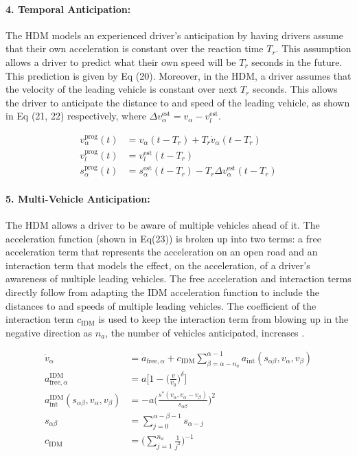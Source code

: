 \documentclass[12pt]{article}
\begin{document}
\paragraph{4. Temporal Anticipation:}
The HDM models an experienced driver's anticipation by having drivers assume that their own acceleration is constant over the reaction time $T_r$.  This assumption allows a driver to predict what their own speed will be $T_r$ seconds in the future.  This prediction is given by Eq (20).  Moreover, in the HDM, a driver assumes that the velocity of the leading vehicle is constant over next $T_r$ seconds.  This allows the driver to anticipate the distance to and speed of the leading vehicle, as shown in Eq (21, 22) respectively, where $\Delta v_\alpha^\text{est}=v_\alpha-v_l^\text{est}$.
\begin{mymathbox}[ams gather, title=Temporal Anticipation Equations,colframe=blue!30!black]
  \begin{align}
  v_\alpha^{\text{prog}}(t)&=v_\alpha(t-T_r)+T_r\dot v_\alpha(t-T_r)\\
  v_l^{\text{prog}}(t)&=v_l^\text{est}(t-T_r)\\
  s_\alpha^{\text{prog}}(t)&=s_\alpha^\text{est}(t-T_r)-T_r\Delta v_\alpha^\text{est}(t-T_r)
  \end{align}
\end{mymathbox}
\paragraph{5. Multi-Vehicle Anticipation:}
The HDM allows a driver to be aware of multiple vehicles ahead of it.  The acceleration function (shown in Eq(23)) is broken up into two terms: a free acceleration term that represents the acceleration on an open road and an interaction term that models the effect, on the acceleration, of a driver's awareness of multiple leading vehicles.  The free acceleration and interaction terms directly follow from adapting the IDM acceleration function to include the distances to and speeds of multiple leading vehicles.  The coefficient of the interaction term $c_{\text{IDM}}$ is used to keep the interaction term from blowing up in the negative direction as $n_a$, the number of vehicles anticipated, increases \cite[chapter~12]{treiber_kesting_2013}.
\begin{mymathbox}[ams gather, title=Multi-Vehicle Anticipation Equations,colframe=blue!30!black]
  \begin{align}
  \dot v_\alpha &= a_{\text{free},\alpha}+c_{\text{IDM}}\sum_{\beta=\alpha-n_a}^{\alpha-1}a_{\text{int}}(s_{\alpha\beta},v_\alpha,v_\beta)\\
  a^{\text{IDM}}_{\text{free},\alpha}&=a\Bigg[1-\bigg(\frac{v}{v_0}\bigg)^\delta\Bigg]\\
  a^{\text{IDM}}_{\text{int}}(s_{\alpha\beta},v_\alpha,v_\beta)&=-a\Bigg(\frac{s^*(v_\alpha,v_\alpha-v_\beta)}{s_{\alpha\beta}}\Bigg)^2\\
  s_{\alpha\beta}&=\sum_{j=0}^{\alpha-\beta-1}s_{\alpha-j}\\
  c_{\text{IDM}}&=\Bigg(\sum_{j=1}^{n_a}\frac{1}{j^2}\Bigg)^{-1}
  \end{align}
\end{mymathbox}
\end{document}
